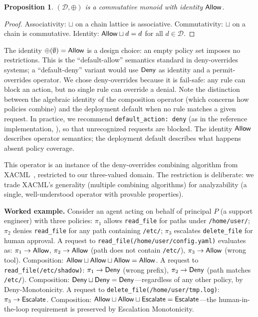 \documentclass[11pt,a4paper]{article}
\newtheorem{proposition}[definition]{Proposition}
\newcommand{\termlabel}[1]{\ifmmode\mathsf{#1}\else{\normalfont\textsc{\MakeLowercase{#1}}}\fi}
\newcommand{\Allow}{\termlabel{Allow}}
\newcommand{\Deny}{\termlabel{Deny}}
\newcommand{\Escalate}{\termlabel{Escalate}}
\begin{document}
\begin{proposition}
$(\mathcal{D}, \oplus)$ is a commutative monoid with identity $\Allow$.
\end{proposition}

\begin{proof}
Associativity: $\sqcup$ on a chain lattice is associative. Commutativity: $\sqcup$ on a chain is commutative. Identity: $\Allow \sqcup d = d$ for all $d \in \mathcal{D}$.
\end{proof}

\noindent The identity $\oplus(\emptyset) = \Allow$ is a design choice: an empty policy set imposes no restrictions. This is the ``default-allow'' semantics standard in deny-overrides systems; a ``default-deny'' variant would use $\Deny$ as identity and a permit-overrides operator. We chose deny-overrides because it is fail-safe: any rule can block an action, but no single rule can override a denial. Note the distinction between the algebraic identity of the composition operator (which concerns how policies combine) and the deployment default when no rule matches a given request. In practice, we recommend \texttt{default\_action: deny} (as in the reference implementation, ), so that unrecognized requests are blocked. The identity $\Allow$ describes operator semantics; the deployment default describes what happens absent policy coverage.

\noindent This operator is an instance of the deny-overrides combining algorithm from XACML~\citep{xacml2013}, restricted to our three-valued domain. The restriction is deliberate: we trade XACML's generality (multiple combining algorithms) for analyzability (a single, well-understood operator with provable properties).

\vspace{4pt}
\noindent\textbf{Worked example.} Consider an agent acting on behalf of principal $P$ (a support engineer) with three policies: $\pi_1$ allows \texttt{read\_file} for paths under \texttt{/home/user/}; $\pi_2$ denies \texttt{read\_file} for any path containing \texttt{/etc/}; $\pi_3$ escalates \texttt{delete\_file} for human approval. A request to \texttt{read\_file(/home/user/config.yaml)} evaluates as: $\pi_1 \to \Allow$, $\pi_2 \to \Allow$ (path does not contain \texttt{/etc/}), $\pi_3 \to \Allow$ (wrong tool). Composition: $\Allow \sqcup \Allow \sqcup \Allow = \Allow$. A request to \texttt{read\_file(/etc/shadow)}: $\pi_1 \to \Deny$ (wrong prefix), $\pi_2 \to \Deny$ (path matches \texttt{/etc/}). Composition: $\Deny \sqcup \Deny = \Deny$---regardless of any other policy, by Deny-Monotonicity. A request to \texttt{delete\_file(/home/user/tmp.log)}: $\pi_3 \to \Escalate$. Composition: $\Allow \sqcup \Allow \sqcup \Escalate = \Escalate$---the human-in-the-loop requirement is preserved by Escalation Monotonicity.
\end{document}
